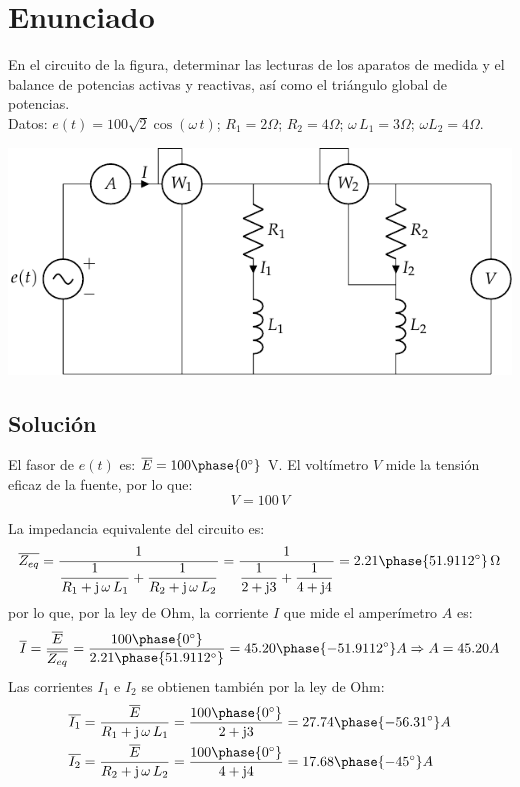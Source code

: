 \section{Enunciado}

En el circuito de la figura, determinar las lecturas de los aparatos de medida y el balance de potencias activas y reactivas, así como el triángulo global de potencias.\\
Datos: $e(t)=100\sqrt{2}\cos(\omega\,t)$; $R_1=2\Omega$;
$R_2=4\Omega$; $\omega\,L_1=3\Omega$; $\omega L_2=4\Omega$.

\begin{center}
  \includegraphics{figuras/BT2_11.pdf}
\end{center}

\subsection*{Solución}

El fasor de $e(t)$ es: $\overline{E}=100\phase{0^\circ}$ V. El
voltímetro $V$ mide la tensión eficaz de la fuente, por lo que:
\begin{equation*}
  V=100\,V
\end{equation*}

La impedancia equivalente del circuito es:
\begin{equation*}
  \overline{Z_{eq}}=\dfrac{1}{\dfrac{1}{R_1+\mathrm{j}\,\omega\,L_1}+\dfrac{1}{R_2+\mathrm{j}\,\omega\,L_2}}=\dfrac{1}{\dfrac{1}{2+\mathrm{j} 3}+\dfrac{1}{4+\mathrm{j} 4}}=2.21\phase{51.9112^\circ}\,\Omega
\end{equation*}
por lo que, por la ley de Ohm, la corriente $I$ que mide el
amperímetro $A$ es:
\begin{equation*}
  \overline{I}=\dfrac{\overline{E}}{\overline{Z_{eq}}}=\dfrac{100\phase{0^\circ}}{2.21\phase{51.9112^\circ}}=45.20\phase{-51.9112^\circ} A \Rightarrow A = 45.20 A
\end{equation*}
Las corrientes $I_1$ e $I_2$ se obtienen también por la ley de Ohm:
\begin{align*}
  \overline{I_1}&=\dfrac{\overline{E}}{R_1+\mathrm{j}\,\omega\,L_1}=\dfrac{100\phase{0^\circ}}{2+\mathrm{j} 3}=27.74\phase{-56.31^\circ} A\\
  \overline{I_2}&=\dfrac{\overline{E}}{R_2+\mathrm{j}\,\omega\,L_2}=\dfrac{100\phase{0^\circ}}{4+\mathrm{j} 4}=17.68\phase{-45^\circ} A
\end{align*}


